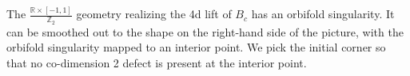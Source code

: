 \documentclass{article}
\begin{document}
The $\frac{\mathbb{R} \times [-1,1]}{\mathbb{Z}_2}$ geometry realizing the 4d lift of $B_c$ has an orbifold singularity. It can be smoothed out to the shape on the right-hand side of the picture, with the orbifold singularity mapped to an interior point. We pick the initial corner so that no co-dimension 2 defect is present at the interior point.

\end{document}
